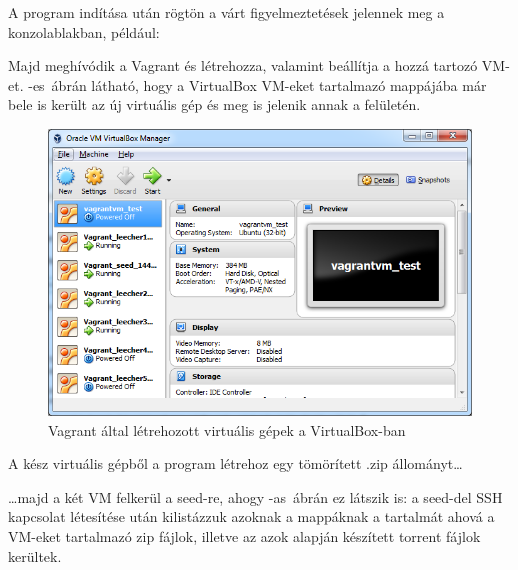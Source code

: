 A program indítása után rögtön a várt figyelmeztetések jelennek meg a konzolablakban, például:


Majd meghívódik a Vagrant és létrehozza, valamint beállítja a hozzá tartozó VM-et. -es~ábrán látható, hogy a VirtualBox VM-eket tartalmazó mappájába már bele is került az új virtuális gép és meg is jelenik annak a felületén.

\begin{figure}[ht]
\centering
\includegraphics[width=140mm, keepaspectratio]{figures/test_vbox.png}
\caption{Vagrant által létrehozott virtuális gépek a VirtualBox-ban}
\label{fig:vboxcap}
\end{figure}
A kész virtuális gépből a program létrehoz egy tömörített .zip állományt\ldots


\ldots majd a két VM felkerül a seed-re, ahogy -as~ábrán ez látszik is:  a seed-del SSH kapcsolat létesítése után kilistázzuk azoknak a mappáknak a tartalmát ahová a VM-eket tartalmazó zip fájlok, illetve az azok alapján készített torrent fájlok kerültek.

